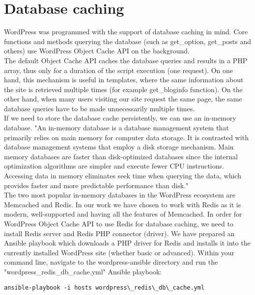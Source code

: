\section{Database caching}

WordPress was programmed with the support of database caching in mind. Core functions and methods querying the database (such as get\_option, get\_posts and others) use WordPress Object Cache API \cite{WP:Object-Cache-API} on the background. \\

The default Object Cache API caches the database queries and results in a PHP array, thus only for a duration of the script execution (one request). On one hand, this mechanism is useful in templates, where the same information about the site is retrieved multiple times (for example get\_bloginfo function). On the other hand, when many users visiting our site request the same page, the same database queries have to be made unnecessarily multiple times. \\

If we need to store the database cache persistently, we can use an in-memory database. "An in-memory database is a database management system that primarily relies on main memory for computer data storage. It is contrasted with database management systems that employ a disk storage mechanism. Main memory databases are faster than disk-optimized databases since the internal optimization algorithms are simpler and execute fewer CPU instructions. Accessing data in memory eliminates seek time when querying the data, which provides faster and more predictable performance than disk." \cite{Wiki:in-memory-database}\\

The two most popular in-memory databases in the WordPress ecosystem are Memcached and Redis. In our work we have chosen to work with Redis as it is modern, well-supported and having all the features of Memcached. \cite{SO:Redis-vs-Memcached} In order for WordPress Object Cache API to use Redis for database caching, we need to install Redis server and Redis PHP connector (driver). We have prepared an Ansible playbook which downloads a PHP driver for Redis and installs it into the currently installed WordPress site (whether basic or advanced). Within your command line, navigate to the wordpress-ansible directory and run the "wordpress\_redis\_db\_cache.yml" Ansible playbook:

\begin{lstlisting}
ansible-playbook -i hosts wordpress\_redis\_db\_cache.yml
\end{lstlisting}


